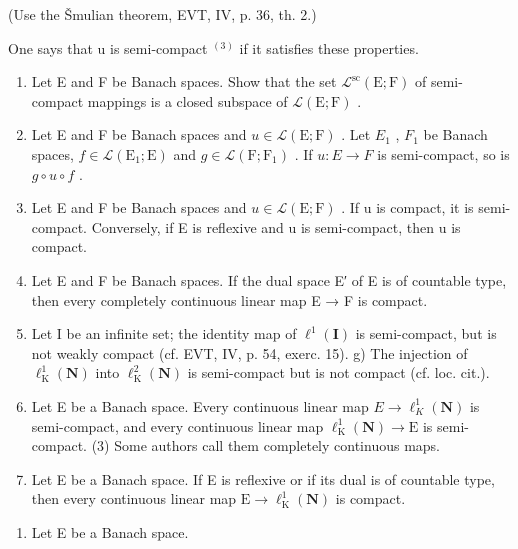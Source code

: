 (Use the Šmulian theorem, EVT, IV, p. 36, th. 2.)

One says that u is semi-compact \(^{(3)}\) if it satisfies these properties.

\begin{enumerate}
\def\labelenumi{\alph{enumi})}
\setcounter{enumi}{1}
\item
  Let E and F be Banach spaces. Show that the set \(\mathcal{L}^{\mathrm{sc}}(\mathrm{E};\mathrm{F})\) of semi-compact mappings is a closed subspace of \(\mathcal{L}(\mathrm{E};\mathrm{F})\) .
\item
  Let E and F be Banach spaces and \(u \in \mathcal{L}(\mathrm{E};\mathrm{F})\) . Let \(E_{1}\) , \(F_{1}\) be Banach spaces, \(f \in \mathcal{L}(\mathrm{E}_{1};\mathrm{E})\) and \(g \in \mathcal{L}(\mathrm{F};\mathrm{F}_{1})\) . If \(u: E \to F\) is semi-compact, so is \(g \circ u \circ f\) .
\item
  Let E and F be Banach spaces and \(u \in \mathcal{L}(\mathrm{E};\mathrm{F})\) . If u is compact, it is semi-compact. Conversely, if E is reflexive and u is semi-compact, then u is compact.
\item
  Let E and F be Banach spaces. If the dual space E′ of E is of countable type, then every completely continuous linear map E → F is compact.
\item
  Let I be an infinite set; the identity map of \(\ell^{1}(\mathbf{I})\) is semi-compact, but is not weakly compact (cf. EVT, IV, p. 54, exerc. 15). g) The injection of \(\ell_{\mathrm{K}}^{1}(\mathbf{N})\) into \(\ell_{\mathrm{K}}^{2}(\mathbf{N})\) is semi-compact but is not compact (cf. loc. cit.).
\item
  Let E be a Banach space. Every continuous linear map \(E \rightarrow \ell_{K}^{1}(\mathbf{N})\) is semi-compact, and every continuous linear map \(\ell_{\mathrm{K}}^{1}(\mathbf{N}) \rightarrow \mathrm{E}\) is semi-compact.
(3) Some authors call them completely continuous maps.
\item
  Let E be a Banach space. If E is reflexive or if its dual is of countable type, then every continuous linear map \(\mathrm{E} \to \ell_{\mathrm{K}}^{1}(\mathbf{N})\) is compact.
\end{enumerate}

\begin{enumerate}
\def\labelenumi{\arabic{enumi})}
\setcounter{enumi}{30}
\tightlist
\item
  Let E be a Banach space.
\end{enumerate}

